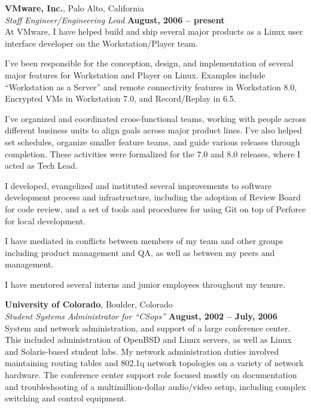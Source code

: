 \documentclass[margin,line]{resume}
\begin{document}
\begin{resume}
    \vspace{3mm}
    {\bf VMware, Inc.}, Palo Alto, California \vspace{2mm}\\\vspace{1mm}%
    {\sl Staff Engineer/Engineering Lead} \hfill {\bf August, 2006 -- present}\\
    At VMware, I have helped build and ship several major products as a Linux
    user interface developer on the Workstation/Player team.
    \vspace{3mm}
    \begin{list1}
    \item I've been responsible for the conception, design, and implementation
          of several major features for Workstation and Player on Linux.
          Examples include ``Workstation as a Server'' and remote connectivity
          features in Workstation 8.0, Encrypted VMs in Workstation 7.0, and
          Record/Replay in 6.5.
    \item I've organized and coordinated cross-functional teams, working with
          people across different business units to align goals across major
          product lines. I've also helped set schedules, organize smaller
          feature teams, and guide various releases through completion. These
          activities were formalized for the 7.0 and 8.0 releases, where I acted
          as Tech Lead.
    \item I developed, evangelized and instituted several improvements to
          software development process and infrastructure, including the
          adoption of Review Board for code review, and a set of tools and
          procedures for using Git on top of Perforce for local development.
    \item I have mediated in conflicts between members of my team and other
          groups including product management and QA, as well as between my
          peers and management.
    \item I have mentored several interns and junior employees throughout my
          tenure.
    \end{list1}

    \ifcv
        \newpage
        {\bf University of Colorado}, Boulder, Colorado \vspace{2mm}\\\vspace{1mm}%
        {\sl Student Systems Administrator for ``CSops''} \hfill {\bf August, 2002 -- July, 2006}\\
        System and network administration, and support of a large conference
        center. This included administration of OpenBSD and Linux servers, as well
        as Linux and Solaris-based student labs. My network administration duties
        involved maintaining routing tables and 802.1q network topologies on a
        variety of network hardware. The conference center support role focused
        mostly on documentation and troubleshooting of a multimillion-dollar
        audio/video setup, including complex switching and control equipment.


\end{resume}
\end{document}
